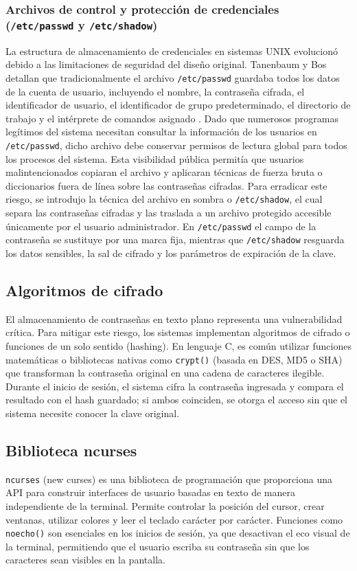 \subsubsection{Archivos de control y protección de credenciales (\texttt{/etc/passwd} y \texttt{/etc/shadow})}

La estructura de almacenamiento de credenciales en sistemas UNIX evolucionó debido a las limitaciones de seguridad del diseño original.
Tanenbaum y Bos detallan que tradicionalmente el archivo \texttt{/etc/passwd} guardaba todos los datos de la cuenta de usuario, incluyendo el nombre, la contraseña cifrada, el identificador de usuario, el identificador de grupo predeterminado, el directorio de trabajo y el intérprete de comandos asignado \cite{tanenbaum2024}.
Dado que numerosos programas legítimos del sistema necesitan consultar la información de los usuarios en \texttt{/etc/passwd}, dicho archivo debe conservar permisos de lectura global para todos los procesos del sistema.
Esta visibilidad pública permitía que usuarios malintencionados copiaran el archivo y aplicaran técnicas de fuerza bruta o diccionarios fuera de línea sobre las contraseñas cifradas.
Para erradicar este riesgo, se introdujo la técnica del archivo en sombra o \texttt{/etc/shadow}, el cual separa las contraseñas cifradas y las traslada a un archivo protegido accesible únicamente por el usuario administrador.
En \texttt{/etc/passwd} el campo de la contraseña se sustituye por una marca fija, mientras que \texttt{/etc/shadow} resguarda los datos sensibles, la sal de cifrado y los parámetros de expiración de la clave.

\subsection{Algoritmos de cifrado}

El almacenamiento de contraseñas en texto plano representa una vulnerabilidad crítica.
Para mitigar este riesgo, los sistemas implementan algoritmos de cifrado o funciones de un solo sentido (hashing).
En lenguaje C, es común utilizar funciones matemáticas o bibliotecas nativas como \texttt{crypt()} (basada en DES, MD5 o SHA) que transforman la contraseña original en una cadena de caracteres ilegible.
Durante el inicio de sesión, el sistema cifra la contraseña ingresada y compara el resultado con el hash guardado; si ambos coinciden, se otorga el acceso sin que el sistema necesite conocer la clave original.

\subsection{Biblioteca ncurses}

\texttt{ncurses} (new curses) es una biblioteca de programación que proporciona una API para construir interfaces de usuario basadas en texto de manera independiente de la terminal.
Permite controlar la posición del cursor, crear ventanas, utilizar colores y leer el teclado carácter por carácter.
Funciones como \texttt{noecho()} son esenciales en los inicios de sesión, ya que desactivan el eco visual de la terminal, permitiendo que el usuario escriba su contraseña sin que los caracteres sean visibles en la pantalla.

\newpage
